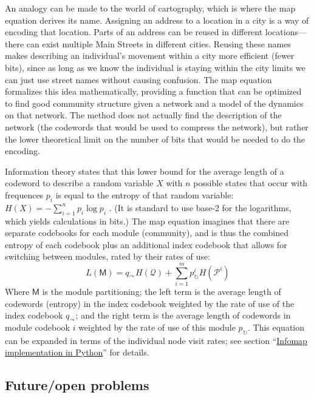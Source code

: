 An analogy can be made to the world of cartography, which is where the
map equation derives its name. Assigning an address to a location in a
city is a way of encoding that location. Parts of an address can be
reused in different locations---there can exist multiple Main Streets in
different cities. Reusing these names makes describing an individual's
movement within a city more efficient (fewer bits), since as long as we
know the individual is staying within the city limits we can just use
street names without causing confusion. The map equation formalizes this
idea mathematically, providing a function that can be optimized to find
good community structure given a network and a model of the dynamics on
that network. The method does not actually find the description of the
network (the codewords that would be used to compress the network), but
rather the lower theoretical limit on the number of bits that would be
needed to do the encoding.

Information theory states that this lower bound for the average length
of a codeword to describe a random variable \(X\) with \(n\) possible
states that occur with frequences \(p_i\) is equal to the entropy of
that random variable: \(H(X) = -\sum_{i=1}^{n}{p_i\log{p_i}}\)
\autocite{cover_elements_2012}. (It is standard to use base-2 for the
logarithms, which yields calculations in bits.) The map equation
imagines that there are separate codebooks for each module (community),
and is thus the combined entropy of each codebook plus an additional
index codebook that allows for switching between modules, rated by their
rates of use:
\[L(\mathsf{M}) = q_{\curvearrowright} H(\mathcal{Q}) + \sum_{i=1}^{m}{p_{\circlearrowright}^{i} H(\mathcal{P}^i)}\]
Where \(\mathsf{M}\) is the module partitioning; the left term is the
average length of codewords (entropy) in the index codebook weighted by
the rate of use of the index codebook \(q_{\curvearrowright}\); and the
right term is the average length of codewords in module codebook \(i\)
weighted by the rate of use of this module \(p_{\circlearrowright}\).
This equation can be expanded in terms of the individual node visit
rates; see section ``\protect\hyperlink{pyinfomap}{Infomap
implementation in Python}'' for details.



\subsection{Future/open problems}\label{futureopen-problems}

